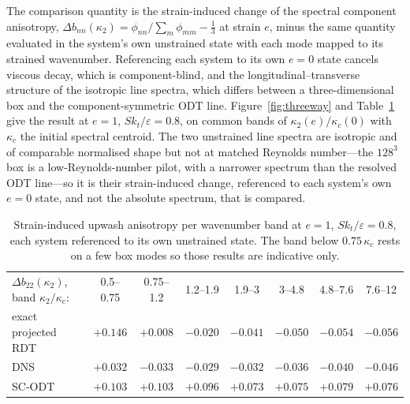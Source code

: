 \documentclass[lineno]{JFM-FLM_Au}
\begin{document}
The comparison quantity is the strain-induced change of the spectral
component anisotropy,
$\Delta b_{nn}(\kappa_2)=\phi_{nn}/\sum_m\phi_{mm}-\tfrac13$ at strain $e$,
minus the same quantity evaluated in the system's own unstrained state with
each mode mapped to its strained wavenumber. Referencing each system to its
own $e=0$ state cancels viscous decay, which is component-blind, and the
longitudinal--transverse structure of the isotropic line spectra, which
differs between a three-dimensional box and the component-symmetric ODT
line. Figure~\ref{fig:threeway} and Table~\ref{tab:threeway} give the
result at $e=1$, $Sk_t/\varepsilon=0.8$, on common bands of
$\kappa_2(e)/\kappa_c(0)$ with $\kappa_c$ the initial spectral centroid.
The two unstrained line spectra are isotropic and of comparable normalised
shape but not at matched Reynolds number---the $128^3$ box is a
low-Reynolds-number pilot, with a narrower spectrum than the resolved
ODT line---so it is their strain-induced change, referenced to each
system's own $e=0$ state, and not the absolute spectrum, that is compared.

\begin{table}
  \centering\small
  \begin{tabular}{lccccccc}
  $\Delta b_{22}(\kappa_2)$, band $\kappa_2/\kappa_c$: & 0.5--0.75 & 0.75--1.2 & 1.2--1.9 & 1.9--3 & 3--4.8 & 4.8--7.6 & 7.6--12\\[2pt]
  exact projected RDT & $+0.146$ & $+0.008$ & $-0.020$ & $-0.041$ & $-0.050$ & $-0.054$ & $-0.056$\\
  DNS                 & $+0.032$ & $-0.033$ & $-0.029$ & $-0.032$ & $-0.036$ & $-0.040$ & $-0.046$\\
  SC-ODT              & $+0.103$ & $+0.103$ & $+0.096$ & $+0.073$ & $+0.075$ & $+0.079$ & $+0.076$\\
  \end{tabular}
  \caption{Strain-induced upwash anisotropy per wavenumber band at $e=1$,
  $Sk_t/\varepsilon=0.8$, each system referenced to its own unstrained
  state. The band below $0.75\,\kappa_c$ rests on a few box modes so those results are
  indicative only.}
  \label{tab:threeway}
\end{table}
\end{document}
